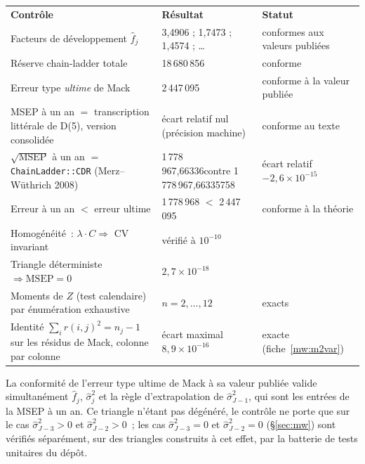 \documentclass[a4paper,11pt]{article}
\newcommand{\code}[1]{\texttt{\small #1}}
\begin{document}
\begin{center}
\small
{}
\begin{tabular}{@{}p{6.9cm}p{4.1cm}p{3.9cm}@{}}
\rowcolor{tableheader}
\textcolor{financeblue}{\textbf{Contrôle}} &
\textcolor{financeblue}{\textbf{Résultat}} &
\textcolor{financeblue}{\textbf{Statut}} \\
Facteurs de développement $\hat f_j$ & 3,4906 ; 1,7473 ; 1,4574 ; \dots &
conformes aux valeurs publiées \\
Réserve chain-ladder totale & 18\,680\,856 & conforme \\
Erreur type \emph{ultime} de Mack & 2\,447\,095 & conforme à la valeur publiée \\
MSEP à un an $=$ transcription littérale de D(5), version consolidée & écart relatif nul
(précision machine) & conforme au texte \\
$\sqrt{\mathrm{MSEP}}$ à un an $=$ \code{ChainLadder::CDR} (Merz--Wüthrich
2008) & 1\,778\,967,66336\newline contre 1\,778\,967,66335758 & écart relatif
$-2{,}6\times10^{-15}$ \\
Erreur à un an $<$ erreur ultime & 1\,778\,968 $<$ 2\,447\,095 &
conforme à la théorie \\
Homogénéité~: $\lambda\!\cdot\!C \Rightarrow$ CV invariant & vérifié à
$10^{-10}$ & \\
Triangle déterministe $\Rightarrow \mathrm{MSEP} = 0$ &
$2{,}7\times10^{-18}$ & \\
Moments de $Z$ (test calendaire) par énumération exhaustive & $n = 2,\dots,12$ &
exacts \\
Identité $\sum_i r(i,j)^2 = n_j - 1$ sur les résidus de Mack, colonne par
colonne & écart maximal $8{,}9\times10^{-16}$ &
exacte (fiche~\ref{mw:m2var}) \\
\end{tabular}
\end{center}

\noindent
La conformité de l'erreur type ultime de Mack à sa valeur publiée valide
simultanément $\hat f_j$, $\hat\sigma_j^2$ et la règle d'extrapolation de
$\hat\sigma_{J-1}^2$, qui sont les entrées de la MSEP à un an. Ce triangle
n'étant pas dégénéré, le contrôle ne porte que sur le cas
$\hat\sigma^2_{J-3} > 0$ et $\hat\sigma^2_{J-2} > 0$~; les cas $\hat\sigma^2_{J-3} = 0$ et
$\hat\sigma^2_{J-2} = 0$ (§\ref{sec:mw}) sont vérifiés séparément, sur des triangles construits à cet effet, par la batterie de
tests unitaires du dépôt.
\end{document}
